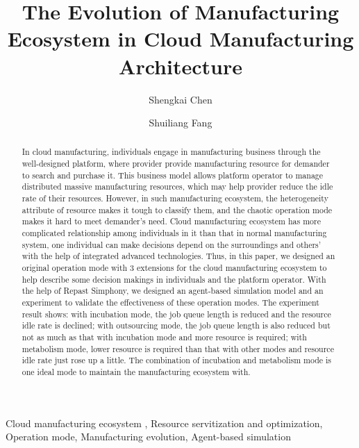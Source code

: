 
\title{The Evolution of Manufacturing Ecosystem in Cloud Manufacturing Architecture
}

\author[add1]{Shengkai Chen}
\author[add1,add2]{Shuiliang Fang}
\address[add1]{Key Laboratory of Advanced Manufacturing Technology of Zhejiang Province, College of Mechanical Engineering, Zhejiang University, Hangzhou , 310027, China}
\address[add2]{The State Key Laboratory of Fluid Power Transmission and Control, College of Mechanical Engineering, Zhejiang University, Hangzhou, 310027, China}



\begin{abstract}
In cloud manufacturing, individuals engage in manufacturing business through the well-designed platform, where provider provide manufacturing resource for demander to search and purchase it. This business model allows platform operator to manage distributed massive manufacturing resources, which may help provider reduce the idle rate of their resources.
However, in such manufacturing ecosystem, the heterogeneity attribute of resource makes it tough to classify them, and the chaotic operation mode makes it hard to meet demander's need.
Cloud manufacturing ecosystem has more complicated relationship among individuals in it than that in normal manufacturing system, one individual can make decisions depend on the surroundings and others' with the help of integrated advanced technologies. Thus, in this paper, we designed an original operation mode with 3 extensions for the cloud manufacturing ecosystem to help describe some decision makings in individuals and the platform operator.
With the help of Repast Simphony, we designed an agent-based simulation model and an experiment to validate the effectiveness of these operation modes. The experiment result shows: with incubation mode, the job queue length is reduced and the resource idle rate is declined; with outsourcing mode, the job queue length is also reduced but not as much as that with incubation mode and more resource is required; with metabolism mode, lower resource is required than that with other modes and resource idle rate just rose up a little. The combination of incubation and metabolism mode is one ideal mode to maintain the manufacturing ecosystem with.
\end{abstract}

\begin{keyword}
Cloud manufacturing ecosystem \sep
Resource servitization and optimization\sep
Operation mode\sep
Manufacturing evolution\sep
Agent-based simulation

\end{keyword}

